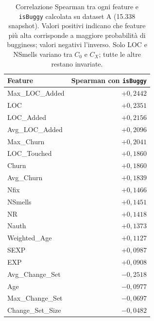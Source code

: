 \begin{table}[h!]
\centering\small
\begin{tabular}{@{}lr@{}}
\toprule
\textbf{Feature} & \textbf{Spearman con \texttt{isBuggy}} \\
\midrule
Max\_LOC\_Added      &  $+0{,}2442$ \\
LOC                  &  $+0{,}2351$ \\
LOC\_Added           &  $+0{,}2156$ \\
Avg\_LOC\_Added      &  $+0{,}2096$ \\
Max\_Churn           &  $+0{,}2041$ \\
LOC\_Touched         &  $+0{,}1860$ \\
Churn                &  $+0{,}1860$ \\
Avg\_Churn           &  $+0{,}1839$ \\
Nfix                 &  $+0{,}1466$ \\
NSmells              &  $+0{,}1451$ \\
NR                   &  $+0{,}1418$ \\
Nauth                &  $+0{,}1373$ \\
Weighted\_Age        &  $+0{,}1127$ \\
SEXP                 &  $+0{,}0987$ \\
EXP                  &  $+0{,}0908$ \\
\midrule
Avg\_Change\_Set     &  $-0{,}2518$ \\
Age                  &  $-0{,}0977$ \\
Max\_Change\_Set     &  $-0{,}0697$ \\
Change\_Set\_Size    &  $-0{,}0482$ \\
\bottomrule
\end{tabular}
\caption{Correlazione Spearman tra ogni feature e \texttt{isBuggy} calcolata su
dataset A (15.338 snapshot). Valori positivi indicano che feature più alta corrisponde
a maggiore probabilità di bugginess; valori negativi l'inverso.
Solo LOC e NSmells variano tra $C_0$ e $C_X$; tutte le altre restano invariate.}
\label{tab:m4-correlation}
\end{table}
